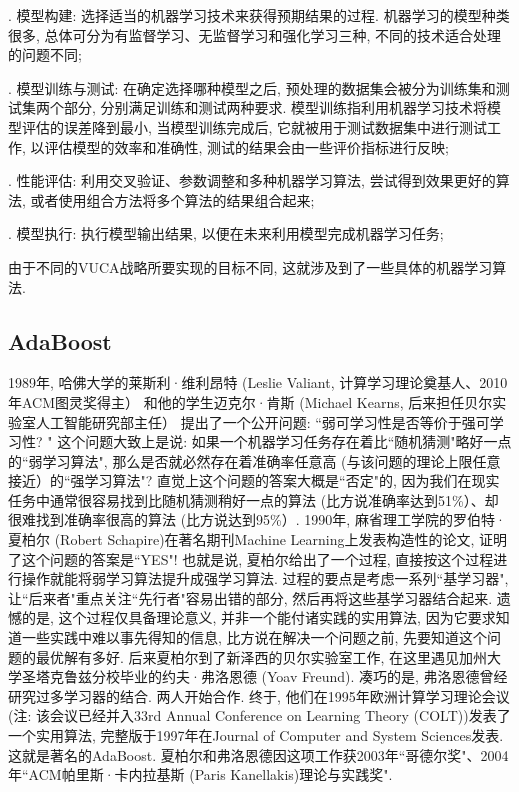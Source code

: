 . 模型构建: 选择适当的机器学习技术来获得预期结果的过程. 机器学习的模型种类很多, 总体可分为有监督学习、无监督学习和强化学习三种, 不同的技术适合处理的问题不同;

. 模型训练与测试: 在确定选择哪种模型之后, 预处理的数据集会被分为训练集和测试集两个部分, 分别满足训练和测试两种要求.
模型训练指利用机器学习技术将模型评估的误差降到最小, 当模型训练完成后, 它就被用于测试数据集中进行测试工作, 以评估模型的效率和准确性, 测试的结果会由一些评价指标进行反映;

. 性能评估: 利用交叉验证、参数调整和多种机器学习算法, 尝试得到效果更好的算法, 或者使用组合方法将多个算法的结果组合起来;

. 模型执行: 执行模型输出结果, 以便在未来利用模型完成机器学习任务;

由于不同的VUCA战略所要实现的目标不同, 这就涉及到了一些具体的机器学习算法.
\subsection{AdaBoost}
\begin{remark}
1989年, 哈佛大学的莱斯利·维利昂特 (Leslie Valiant, 计算学习理论奠基人、2010年ACM图灵奖得主） 和他的学生迈克尔·肯斯 (Michael Kearns, 后来担任贝尔实验室人工智能研究部主任） 提出了一个公开问题: “弱可学习性是否等价于强可学习性? "
这个问题大致上是说: 如果一个机器学习任务存在着比“随机猜测"略好一点的“弱学习算法", 那么是否就必然存在着准确率任意高 (与该问题的理论上限任意接近）的“强学习算法"?
直觉上这个问题的答案大概是“否定"的, 因为我们在现实任务中通常很容易找到比随机猜测稍好一点的算法 (比方说准确率达到51\%）、却很难找到准确率很高的算法 (比方说达到95\%）.
1990年, 麻省理工学院的罗伯特·夏柏尔 (Robert Schapire)在著名期刊Machine Learning上发表构造性的论文, 证明了这个问题的答案是“YES"!
也就是说, 夏柏尔给出了一个过程, 直接按这个过程进行操作就能将弱学习算法提升成强学习算法. 过程的要点是考虑一系列“基学习器", 让“后来者"重点关注“先行者"容易出错的部分, 然后再将这些基学习器结合起来.
遗憾的是, 这个过程仅具备理论意义, 并非一个能付诸实践的实用算法, 因为它要求知道一些实践中难以事先得知的信息, 比方说在解决一个问题之前, 先要知道这个问题的最优解有多好.
后来夏柏尔到了新泽西的贝尔实验室工作, 在这里遇见加州大学圣塔克鲁兹分校毕业的约夫·弗洛恩德 (Yoav Freund). 凑巧的是, 弗洛恩德曾经研究过多学习器的结合. 两人开始合作.
终于, 他们在1995年欧洲计算学习理论会议 (注: 该会议已经并入33rd Annual Conference on Learning Theory (COLT))发表了一个实用算法, 完整版于1997年在Journal of Computer and System Sciences发表. 这就是著名的AdaBoost.
夏柏尔和弗洛恩德因这项工作获2003年“哥德尔奖"、2004年“ACM帕里斯·卡内拉基斯 (Paris Kanellakis)理论与实践奖".
\end{remark}

